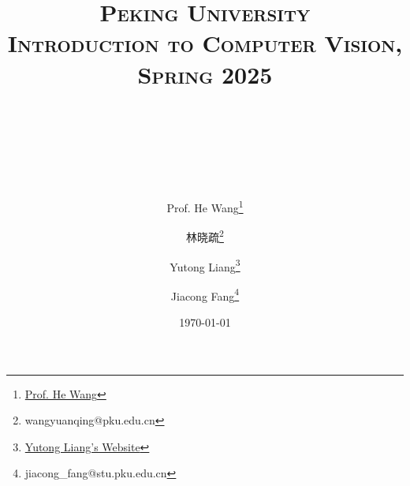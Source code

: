

\title{
{\normalfont\normalsize\textsc{
Peking University\\
Introduction to Computer Vision, Spring 2025 \\[25pt]}}
\horrule{0.5pt}\\
\\
\horrule{1.8pt}\\[20pt]
}

\author[1]{Prof. He Wang\thanks{\href{https://hughw19.github.io/}{Prof. He Wang}}}
\author[2]{林晓疏\thanks{wangyuanqing@pku.edu.cn}}
\author[2]{Yutong Liang\thanks{\href{https://lyt0112.com/}{Yutong Liang's Website}}}
\author[2]{Jiacong Fang\thanks{jiacong\_fang@stu.pku.edu.cn}}

\date{\today}

\pagestyle{fancy}
\fancyhf{}
\fancyhead[L]{\leftmark}  %
\fancyfoot[C]{\thepage}  %



	\maketitle
	
	\clearpage
	\tableofcontents
	
	


	\clearpage
	\appendix
	
	
		
	

    
    
